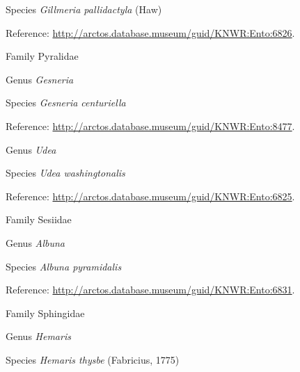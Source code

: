\documentclass[9pt, article]{memoir}
\begin{document}
\begin{multicols}{2}
\vspace{6pt}\noindent\hspace{36pt}Species \textit{Gillmeria pallidactyla} (Haw)


Reference: 
\url{http://arctos.database.museum/guid/KNWR:Ento:6826}.

\vspace{6pt}\noindent\hspace{24pt}Family Pyralidae


\vspace{6pt}\noindent\hspace{30pt}Genus \textit{Gesneria}


\vspace{6pt}\noindent\hspace{36pt}Species \textit{Gesneria centuriella}


Reference: 
\url{http://arctos.database.museum/guid/KNWR:Ento:8477}.

\vspace{6pt}\noindent\hspace{30pt}Genus \textit{Udea}


\vspace{6pt}\noindent\hspace{36pt}Species \textit{Udea washingtonalis}


Reference: 
\url{http://arctos.database.museum/guid/KNWR:Ento:6825}.

\vspace{6pt}\noindent\hspace{24pt}Family Sesiidae


\vspace{6pt}\noindent\hspace{30pt}Genus \textit{Albuna}


\vspace{6pt}\noindent\hspace{36pt}Species \textit{Albuna pyramidalis}


Reference: 
\url{http://arctos.database.museum/guid/KNWR:Ento:6831}.

\vspace{6pt}\noindent\hspace{24pt}Family Sphingidae


\vspace{6pt}\noindent\hspace{30pt}Genus \textit{Hemaris}


\vspace{6pt}\noindent\hspace{36pt}Species \textit{Hemaris thysbe} (Fabricius, 1775)



\end{multicols}
\end{document}
